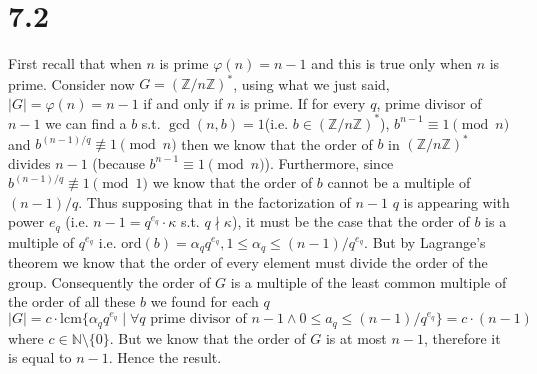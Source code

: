 \documentclass[12pt,a4paper]{article}
\newcommand {\zpz}[1]{\mathbb{Z}/#1\mathbb{Z}}
\newcommand {\nequiv}{\not\equiv}
\newcommand {\ord}{\mathrm{ord}}
\newcommand {\lcm}{\mathrm{lcm}}
\begin{document}
\section*{7.2}
First recall that when $n$ is prime $\varphi(n) = n-1$ and this is true only when $n$ is prime. Consider now $G = (\zpz{n})^*$,
using what we just said, $|G| = \varphi(n) = n - 1$ if and only if $n$ is prime. 
If for every $q$, prime divisor of $n-1$ we can find a $b$ s.t.  $\gcd(n,b)=1$(i.e. $b\in (\zpz{n})^*$), $b^{n-1} \equiv 1 \pmod n$ and  $b^{(n-1)/q}\nequiv 1 \pmod n$ then
we know that the order of $b$ in $(\zpz{n})^*$ divides $n-1$ (because $b^{n-1} \equiv 1 \pmod n$). Furthermore, since $b^{(n-1)/q}\nequiv 1\pmod 1$ we know that the order of $b$
cannot be a multiple of $(n-1)/q$. Thus supposing that in the factorization of $n-1$ $q$ is appearing with power $e_q$ (i.e. $n-1 = q^{e_q} \cdot \kappa$ s.t. $q \nmid \kappa$), 
it must be the case that the order of $b$ is a multiple of $q^{e_q}$ i.e. $\ord(b) = \alpha_q q^{e_q}, 1 \leq \alpha_q \leq (n-1)/q^{e_q} $.
But by Lagrange's theorem we know that the order of every element must divide the order of the group.  Consequently the order of $G$ is a multiple of the least common multiple of the order 
of all these $b$ we found for each $q$
\[
    |G| = c \cdot \lcm\{\alpha_q q^{e_q} \mid \forall q \mbox{ prime divisor of } n-1 \land 0\leq a_q \leq (n-1)/q^{e_q} \} = c \cdot (n-1)
\]
where $c\in\mathbb{N}\setminus\{0\}$.
But we know that the order of $G$ is at most $n-1$, therefore it is equal to $n-1$. Hence the result.
\end{document}
